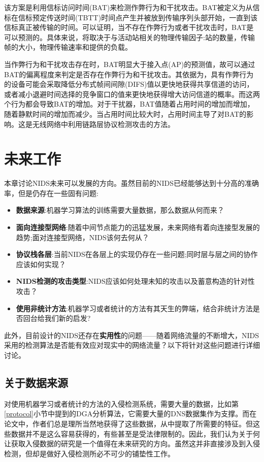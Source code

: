 \documentclass[12pt]{article} %
\begin{document}
该方案是利用信标访问时间(BAT)来检测作弊行为和干扰攻击。BAT被定义为从信标在信标预定传送时间(TBTT)时间点产生并被放到传输序列头部开始，一直到该信标真正被传输的时间。可以证明，当不存在作弊行为或者干扰攻击时，BAT是可以预测的。具体来说，将取决于与活动站相关的物理传输因子:站的数量，传输帧的大小，物理传输速率和提供的负载。

当作弊行为和干扰攻击存在时，BAT明显大于接入点(AP)的预测值，故可以通过BAT的偏离程度来判定是否存在作弊行为和干扰攻击。其依据为，具有作弊行为的设备可能会采取降低分布式帧间间隙(DIFS)值以更快地获得共享信道的访问，或者减小退避时间选择的竞争窗口的值来更快地获得增大访问信道的概率。而这两个行为都会导致BAT的增加。对于干扰器，BAT值随着占用时间的增加而增加，随着静默时间的增加而减少。当占用时间比较大时，占用时间主导了对BAT的影响。这是无线网络中利用链路层协议检测攻击的方法。

\section{未来工作}
\label{future}

本章讨论NIDS未来可以发展的方向。虽然目前的NIDS已经能够达到十分高的准确率，但是仍存在一些固有问题:

\begin{itemize}
	\item \textbf{数据来源}:机器学习算法的训练需要大量数据，那么数据从何而来？
	\item \textbf{面向连接型网络}:随着中间节点能力的迅猛发展，未来网络有着向连接型发展的趋势;面对连接型网络，NIDS该何去何从？
	\item \textbf{协议栈各层}:当前NIDS在各层上的实现仍存在一些问题;同时层与层之间的协作应该如何实现？
	\item \textbf{NIDS检测的攻击类型}:NIDS应该如何处理未知的攻击以及蓄意构造的针对性攻击？
	\item \textbf{使用非统计方法}:机器学习或者统计的方法有其天生的弊端，结合非统计方法是否回台给我们新的启发?
\end{itemize}

此外，目前设计的NIDS还存在\textbf{实用性}的问题——随着网络流量的不断增大，NIDS采用的检测算法是否能有效应对现实中的网络流量？以下将针对这些问题进行详细讨论。

\subsection{关于数据来源}
\label{data}

对使用机器学习或者统计的方法的入侵检测系统，需要大量的数据，比如第\ref{protocol}小节中提到的DGA分析算法，它需要大量的DNS数据集作为支撑。而在论文中，作者们总是理所当然地获得了这些数据，从中提取了所需要的特征。但这些数据并不是这么容易获得的，有些甚至是受法律限制的。因此，我们认为关于何让获取入侵数据的研究是一个值得在未来研究的方向。虽然这并非直接涉及到入侵检测，但却是做好入侵检测所必不可少的铺垫性工作。
\end{document}
